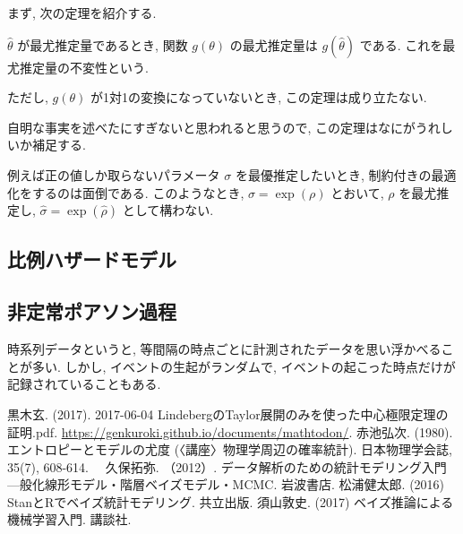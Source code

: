 \documentclass[a4paper, 12pt]{jarticle}
\begin{document}
まず, 次の定理を紹介する. 

\begin{theorem}
$\hat \theta$ が最尤推定量であるとき, 関数 $g(\theta)$ の最尤推定量は $g(\hat \theta)$ である. これを最尤推定量の不変性という.
\end{theorem}
ただし, $g(\theta)$ が1対1の変換になっていないとき, この定理は成り立たない. 

自明な事実を述べたにすぎないと思われると思うので, この定理はなにがうれしいか補足する.

例えば正の値しか取らないパラメータ $\sigma$ を最優推定したいとき, 制約付きの最適化をするのは面倒である. このようなとき, $\sigma=\exp(\rho)$ とおいて, $\rho$ を最尤推定し, $\hat \sigma =\exp(\hat \rho)$ として構わない. 

\subsection{比例ハザードモデル}

\subsection{非定常ポアソン過程}
時系列データというと, 等間隔の時点ごとに計測されたデータを思い浮かべることが多い. しかし, イベントの生起がランダムで, イベントの起こった時点だけが記録されていることもある. 

\begin{thebibliography}{4}
黒木玄. (2017). 2017-06-04 LindebergのTaylor展開のみを使った中心極限定理の証明.pdf. \url{https://genkuroki.github.io/documents/mathtodon/}.
 赤池弘次. (1980). エントロピーとモデルの尤度 (〈講座〉物理学周辺の確率統計). 日本物理学会誌, 35(7), 608-614.
　久保拓弥. （2012）. データ解析のための統計モデリング入門---般化線形モデル・階層ベイズモデル・MCMC. 岩波書店.
 松浦健太郎. (2016) StanとRでベイズ統計モデリング. 共立出版.
 須山敦史. (2017) ベイズ推論による機械学習入門. 講談社.
\end{thebibliography}
\end{document}
